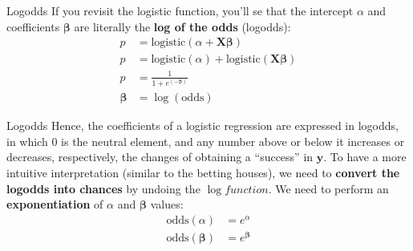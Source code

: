 \begin{frame}{Logodds}
	If you revisit the logistic function, you'll se that the intercept $\alpha$
	and coefficients $\boldsymbol{\beta}$ are literally the \textbf{log of the odds}
	(logodds):
	$$
		\begin{aligned}
			p                  & = \text{logistic}(\alpha +  \mathbf{X} \boldsymbol{\beta} )                 \\
			p                  & = \text{logistic}(\alpha) + \text{logistic}( \mathbf{X} \boldsymbol{\beta}) \\
			p                  & = \frac{1}{1 + e^{(-\boldsymbol{\beta})}}                                   \\
			\boldsymbol{\beta} & = \log(\text{odds})
		\end{aligned}
	$$
\end{frame}

\begin{frame}{Logodds}
	Hence, the coefficients of a logistic regression are expressed in logodds,
	in which $0$ is the neutral element,
	and any number above or below it increases or decreases, respectively,
	the changes of obtaining a ``success'' in $\boldsymbol{y}$.
	To have a more intuitive interpretation (similar to the betting houses),
	we need to \textbf{convert the logodds into chances} by undoing the $\log function$.
	We need to perform an \textbf{exponentiation} of $\alpha$ and $\boldsymbol{\beta}$
	values:
	$$
		\begin{aligned}
			\text{odds}(\alpha)               & = e^\alpha               \\
			\text{odds}({\boldsymbol{\beta}}) & = e^{\boldsymbol{\beta}}
		\end{aligned}
	$$
\end{frame}
